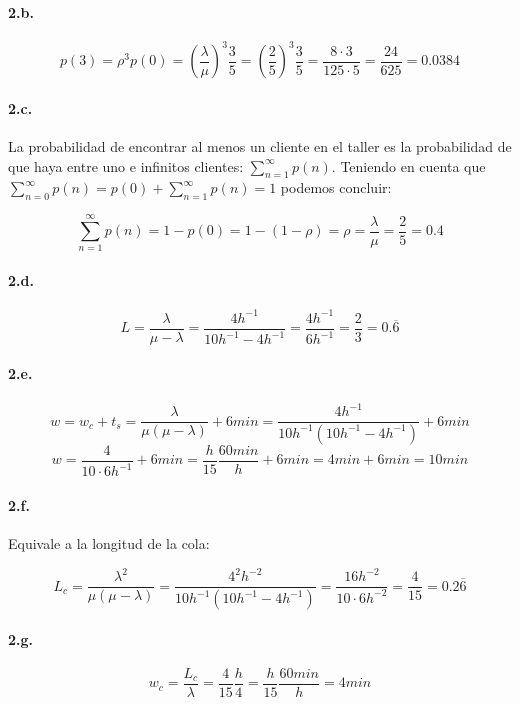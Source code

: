 \documentclass{article}
\begin{document}
    \paragraph{2.b.} 
    $$ p(3) = \rho^{3}p(0) = \left( \frac{\lambda}{\mu} \right)^{3} \frac{3}{5} = \left( \frac{2}{5} \right)^{3} \frac{3}{5} = \frac{8\cdot3}{125\cdot5} = \frac{24}{625} = 0.0384 $$
    
    \paragraph{2.c.} La probabilidad de encontrar al menos un cliente en el taller es la probabilidad de que haya entre uno e infinitos clientes: $ \sum _{n=1}^{\infty} {p(n)} $. Teniendo en cuenta que $ \sum _{n=0}^{\infty} {p(n)} = p(0) + \sum _{n=1}^{\infty} {p(n)} = 1 $ podemos concluir:
     
     $$ \sum _{n=1}^{\infty} {p(n)} = 1 - p(0) = 1 - (1 - \rho) = \rho = \frac{\lambda}{\mu} = \frac{2}{5} = 0.4 $$
    
    \paragraph{2.d.}
    $$ L = \frac{\lambda}{\mu - \lambda} = \frac{4h^{-1}}{10h^{-1} - 4h^{-1}} = \frac{4h^{-1}}{6h^{-1}} = \frac{2}{3} = 0.\overline{6} $$
    
    \paragraph{2.e.} 
    $$ w = w_c + t_s = \frac{\lambda}{\mu(\mu - \lambda)} + 6min = \frac{4h^{-1}}{10h^{-1}(10h^{-1} - 4h^{-1})} + 6min $$
    $$ w = \frac{4}{10\cdot6h^{-1}} + 6min = \frac{h}{15}\frac{60min}{h} + 6min = 4min + 6 min = 10min $$
    
    \paragraph{2.f.} Equivale a la longitud de la cola:
    
    $$ L_c = \frac{\lambda^2}{\mu(\mu - \lambda)} = \frac{4^2 h^{-2}}{10h^{-1}(10h^{-1} - 4h^{-1})} = \frac{16h^{-2}}{10\cdot 6h^{-2}} = \frac{4}{15} = 0.2\overline{6} $$
    
    \paragraph{2.g.}
    $$ w_c = \frac{L_c}{\lambda} = \frac{4}{15} \frac{h}{4} = \frac{h}{15} \frac{60min}{h} = 4 min $$
    
\end{document}
